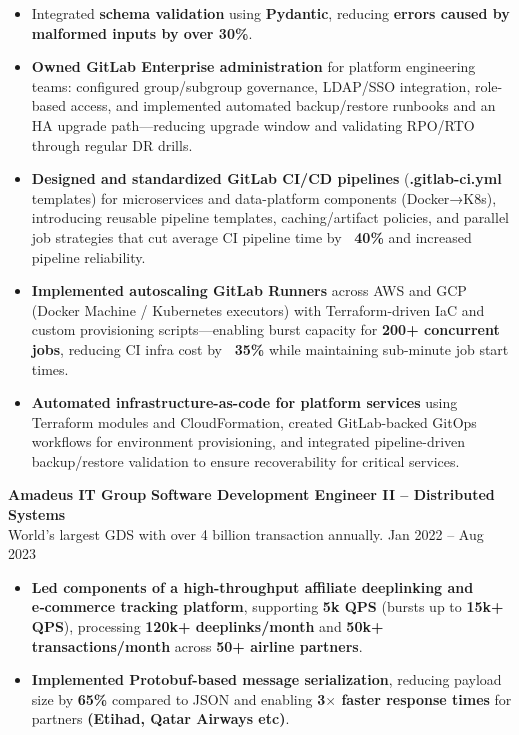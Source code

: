 \documentclass[11 pt]{article}
\begin{document}
\begin{itemize}
  \item Integrated \textbf{schema validation} using \textbf{Pydantic}, reducing \textbf{errors caused by malformed inputs by over 30\%}.

  \item \textbf{Owned GitLab Enterprise administration} for platform engineering teams: configured group/subgroup governance, LDAP/SSO integration, role-based access, and implemented automated backup/restore runbooks and an HA upgrade path—reducing upgrade window and validating RPO/RTO through regular DR drills.

  \item \textbf{Designed and standardized GitLab CI/CD pipelines} (\textbf{.gitlab-ci.yml} templates) for microservices and data-platform components (Docker→K8s), introducing reusable pipeline templates, caching/artifact policies, and parallel job strategies that cut average CI pipeline time by \textbf{~40\%} and increased pipeline reliability.

  \item \textbf{Implemented autoscaling GitLab Runners} across AWS and GCP (Docker Machine / Kubernetes executors) with Terraform-driven IaC and custom provisioning scripts—enabling burst capacity for \textbf{200+ concurrent jobs}, reducing CI infra cost by \textbf{~35\%} while maintaining sub-minute job start times.

  \item \textbf{Automated infrastructure-as-code for platform services} using Terraform modules and CloudFormation, created GitLab-backed GitOps workflows for environment provisioning, and integrated pipeline-driven backup/restore validation to ensure recoverability for critical services.

\end{itemize}

\vspace{6pt}

\noindent
{\normalsize\textbf{Amadeus IT Group}} \hfill \small{\textbf{Software Development Engineer II – Distributed Systems}} \\
{World's largest GDS with over 4 billion transaction annually. \hfill Jan 2022 -- Aug 2023}

\begin{itemize}
\item \textbf{Led components of a high-throughput affiliate deeplinking and e‑commerce tracking platform}, supporting \textbf{5k QPS} (bursts up to \textbf{15k+ QPS}), processing \textbf{120k+ deeplinks/month} and \textbf{50k+ transactions/month} across \textbf{50+ airline partners}.

\item \textbf{Implemented Protobuf-based message serialization}, reducing payload size by \textbf{65\%} compared to
JSON and enabling \textbf{3$\times$ faster response times} for partners \textbf{(Etihad, Qatar Airways etc)}.

\end{itemize}
\end{document}

